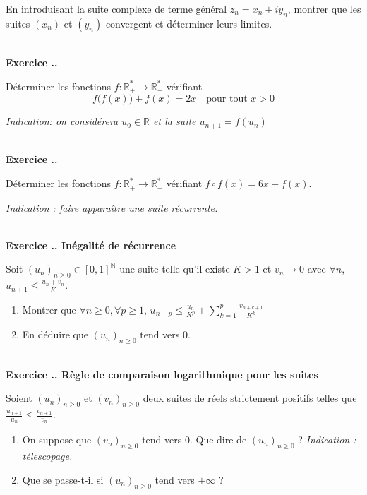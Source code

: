 \documentclass{article}
\newcommand{\mb}[1]{\mathbb{#1}}
\newcounter{exo}
\newcommand{\exercice}[1][\null]{\textbf{\\ Exercice \thesection.\theexo. #1} \addtocounter{exo}{1}}
\begin{document}
En introduisant la suite complexe de terme général $z_{n} = x_{n} + i y_{n}$, 
montrer que les suites $(x_{n})$ et $(y_{n})$ convergent et déterminer leurs limites.

\exercice

Déterminer les fonctions $f\colon \mb{R}_{ + }^{*} \to \mb{R}_{ + }^{*}$ vérifiant
\begin{equation*}
  f\bigl(f(x)\bigr) + f(x) = 2x  \quad\text{pour tout $x>0$}
\end{equation*}

\emph{Indication: on considérera $u_0 \in \mb{R}$ et la suite $u_{n+1} =
f(u_n)$}

\exercice

Déterminer les fonctions $f : \mb{R}_+^* \rightarrow \mb{R}_+^*$ vérifiant $f \circ f(x) = 6x - f(x)$.

\emph{Indication :  faire apparaître une suite récurrente.}


\exercice[Inégalité de récurrence]

Soit $(u_n)_{n \ge 0} \in [0,1]^{\mb{N}}$ une suite telle qu'il existe $K > 1$ et $v_n \rightarrow 0$ avec $\forall n$, $u_{n+1} \le \frac{u_{n} + v_n}{K}$.

\begin{enumerate}

\item Montrer que $\forall n \ge 0, \forall p \ge 1$, $u_{n+p} \le \frac{u_n}{K^p} + \sum_{k=1}^p \frac{v_{n+k+1}}{K^k}$

\item En déduire que $(u_n)_{n \ge 0}$ tend vers $0$.

\end{enumerate}

\exercice[Règle de comparaison logarithmique pour les suites]

Soient $(u_n)_{n \ge 0}$ et $(v_n)_{n \ge 0}$ deux suites de réels strictement positifs telles que $\frac{u_{n+1}}{u_n} \le \frac{v_{n+1}}{v_n}$.

\begin{enumerate}

\item On suppose que $(v_n)_{n \ge 0}$ tend vers $0$. Que dire de $(u_n)_{n \ge 0}$ ? \emph{Indication : télescopage.}

\item Que se passe-t-il si $(u_n)_{n \ge 0}$ tend vers $+ \infty$ ?

\end{enumerate}
\end{document}
